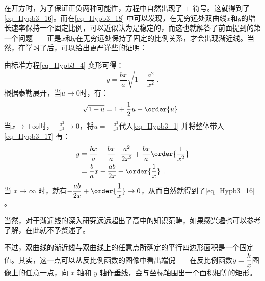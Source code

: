 在开方时，为了保证正负两种可能性，方程中自然出现了 $\pm$ 符号。这就得到了\autoref{eq_Hypb3_16}。而在\autoref{eq_Hypb3_18} 中可以发现，在无穷远处双曲线$x$和$y$的增长速率保持一个固定比例，可以近似认为是稳定的，而这也就解答了前面提到的第一个问题——正是$x$和$y$在无穷远处保持了固定的比例关系，才会出现渐近线。当然，在学习了后，可以给出更严谨些的证明：

由标准方程\autoref{eq_Hypb3_4} 变形可得：
\begin{equation}\label{eq_Hypb3_17}
y = \frac{bx}{a} \sqrt{1-\frac{a^2}{x^2}}~.
\end{equation}
根据泰勒展开，当$u\to 0$时，有：
\begin{equation}\label{eq_Hypb3_1}
\sqrt{1+u} = 1+\frac{1}{2}u+\order{u}~.
\end{equation}
当$x\to+\infty$时，$-\displaystyle\frac{a^2}{x^2}\to0$，将$\displaystyle u=-\frac{a^2}{x^2}$代入\autoref{eq_Hypb3_1} 并将整体带入\autoref{eq_Hypb3_17} 有：
\begin{equation}\label{eq_Hypb3_13}
\begin{split}
y &= \frac{bx}{a} -\frac{bx}{a} \cdot\frac{a^2}{2x^2}+\frac{bx}{a}\order{\frac{1}{x^2}}\\
& = \frac ba x - \frac{ab}{2x} + \order{\frac{1}{x}}~.
\end{split}
\end{equation}
当 $x\to\infty$ 时，就有$\displaystyle- \frac{ab}{2x} + \order{\frac{1}{x}}\to0$，从而自然就得到了\autoref{eq_Hypb3_16} 。

当然，对于渐近线的深入研究远远超出了高中的知识范畴，如果感兴趣也可以参考了解，在此就不予赘述了。

不过，双曲线的渐近线与双曲线上的任意点所确定的平行四边形面积是一个固定值。其实，这一点可以从反比例函数的图像中看出端倪——在反比例函数$\displaystyle y={k\over x}$图像上的任意一点，向 $x$ 轴和 $y$ 轴作垂线，会与坐标轴围出一个面积相等的矩形。


